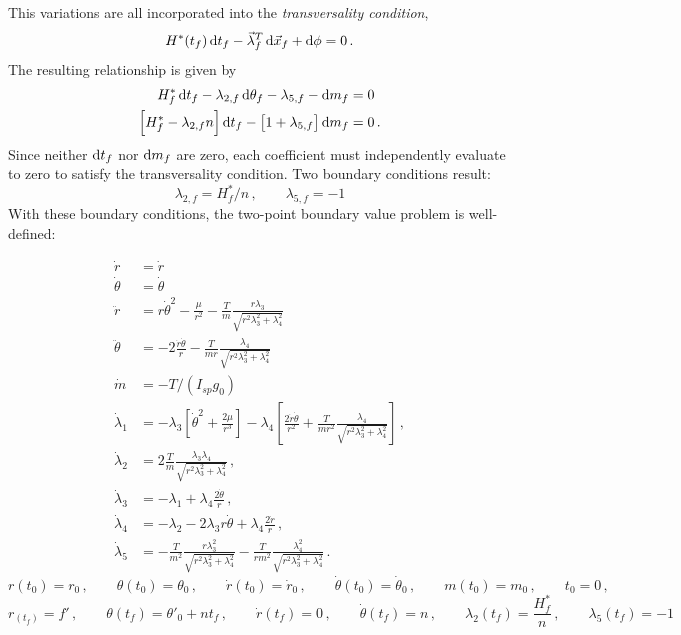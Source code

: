 \documentclass[conf]{new-aiaa}
\begin{document}
This variations are all incorporated into the \textit{transversality condition},
\begin{equation}
	H^*(t_f) \dif t_f - \vec{\lambda}_f^T \dif \vec{x}_f + \dif \phi = 0\,.
\end{equation}
The resulting relationship is given by
\begin{align}
	H^*_f \dif t_f - \lambda_{2,f} \dif \theta_f - \lambda_{5,f} - \dif m_f &= 0 \nonumber\\
	\left[ H^*_f - \lambda_{2,f} n \right] \dif t_f - \left[1 + \lambda_{5,f} \right] \dif m_f &= 0\,.
\end{align}
Since neither $\dif t_f$ nor $\dif m_f$ are zero, each coefficient must independently evaluate to zero to satisfy the transversality condition. Two boundary conditions result:
\[ \lambda_{2,f} = H^*_f/n\,, \qquad \lambda_{5,f} = -1 \]
With these boundary conditions, the two-point boundary value problem is well-defined:

\begin{align*}
	\dot{r} &= \dot{r}\\
	\dot{\theta} &= \dot{\theta}\\
	\ddot{r} &= r\dot{\theta}^2 - \frac{\mu}{r^2} - \frac{T}{m} \frac{r \lambda_3}{\sqrt{r^2\lambda_3^2 + \lambda_4^2}}\\
	\ddot{\theta} &= -2\frac{\dot{r}\dot{\theta}}{r} - \frac{T}{mr} \frac{\lambda_4}{\sqrt{r^2\lambda_3^2 + \lambda_4^2}} \\
	\dot{m} &= -T/(I_{sp} g_0)\\
	\dot{\lambda}_1 &= -\lambda_3\left[ \dot{\theta}^2 + \frac{2\mu}{r^3} \right] - \lambda_4 \left[ \frac{2 \dot{r}\dot{\theta}}{r^2} + \frac{T}{mr^2} \frac{\lambda_4}{\sqrt{r^2\lambda_3^2 + \lambda_4^2}} \right]\,,\\
	\dot{\lambda}_2 &= 2\frac{T}{m} \frac{\lambda_3 \lambda_4}{\sqrt{r^2\lambda_3^2 + \lambda_4^2}}\,,\\
	\dot{\lambda}_3 &= -\lambda_1 + \lambda_4 \frac{2 \dot{\theta}}{r}\,,\\
	\dot{\lambda}_4 &= -\lambda_2 - 2\lambda_3 r \dot{\theta} + \lambda_4 \frac{2\dot{r}}{r}\,,\\
	\dot{\lambda}_5 &= -\frac{T}{m^2} \frac{r \lambda_3^2}{\sqrt{r^2\lambda_3^2 + \lambda_4^2}} - \frac{T}{rm^2} \frac{\lambda_4^2}{\sqrt{r^2\lambda_3^2 + \lambda_4^2}}\,.
\end{align*}
\[ r(t_0) = r_0\,, \qquad \theta(t_0) = \theta_0\,, \qquad \dot{r}(t_0) = \dot{r}_0\,, \qquad \dot{\theta}(t_0) = \dot{\theta}_0\,, \qquad m(t_0) = m_0\,, \qquad t_0 = 0\,, \]
\[ r_(t_f) = f'\,, \qquad \theta(t_f) = \theta'_0 + nt_f\,, \qquad \dot{r}(t_f) = 0\,, \qquad \dot{\theta}(t_f) = n\,, \qquad \lambda_2(t_f) = \frac{H^*_f}{n}\,, \qquad \lambda_5(t_f) = -1\]
\end{document}
